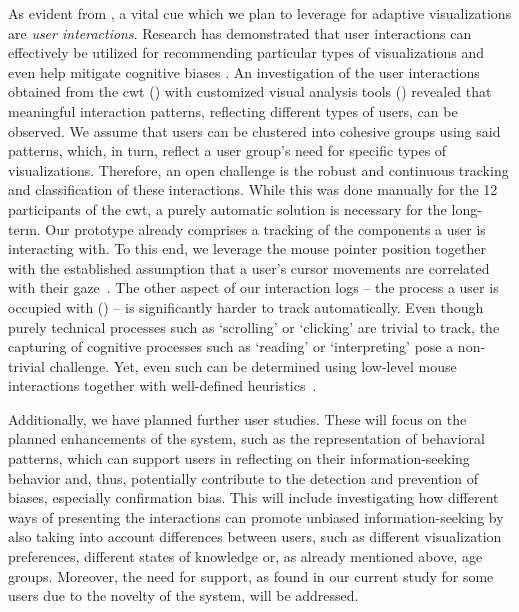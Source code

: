 As evident from , a vital cue which we plan to leverage for adaptive visualizations are \emph{user interactions}.
%
Research has demonstrated that user interactions can effectively be utilized for recommending particular types of visualizations \cite{gotz_behavior-driven_2009} and even help mitigate cognitive biases \cite{gotz_adaptive_2016}.
%
An investigation of the user interactions obtained from the \acrshort{cwt} () with customized visual analysis tools () revealed that meaningful interaction patterns, reflecting different types of users, can be observed.
%
We assume that users can be clustered into cohesive groups using said patterns, which, in turn, reflect a user group's need for specific types of visualizations.
%
Therefore, an open challenge is the robust and continuous tracking and classification of these interactions.
%
While this was done manually for the 12 participants of the \acrshort{cwt}, a purely automatic solution is necessary for the long-term.
%
Our prototype already comprises a tracking of the components a user is interacting with. %
%
To this end, we leverage the mouse pointer position together with the established assumption that a user's cursor movements are correlated with their gaze~\cite{reichle_ez_2006, buscher_eye_2008}.
%
The other aspect of our interaction logs -- the process a user is occupied with () -- is significantly harder to track automatically. 
%
Even though purely technical processes such as `scrolling' or `clicking' are trivial to track, the capturing of cognitive processes such as `reading' or `interpreting' pose a non-trivial challenge.
%
Yet, even such can be determined using low-level mouse interactions together with well-defined heuristics~\cite{10.1145/2207676.2208591, kirsh_virtual_2022}.



Additionally, we have planned further user studies. 
%
These will focus on the planned enhancements of the system, such as the representation of behavioral patterns, which can support users in reflecting on their information-seeking behavior and, thus, potentially contribute to the detection and prevention of biases, especially confirmation bias. 
%
This will include investigating how different ways of presenting the interactions can promote unbiased information-seeking by also taking into account differences between users, such as different visualization preferences, different states of knowledge or, as already mentioned above, age groups. 
%
Moreover, the need for support, as found in our current study for some users due to the novelty of the system, will be addressed.


